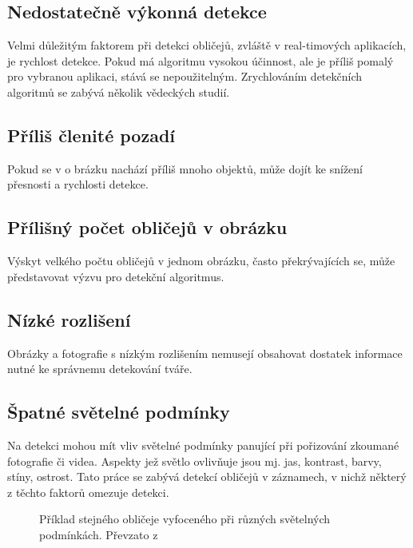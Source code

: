 \subsection*{Nedostatečně výkonná detekce}
Velmi důležitým faktorem při detekci obličejů, zvláště v real-timových aplikacích, je rychlost detekce. Pokud má algoritmu vysokou účinnost, ale je příliš pomalý pro vybranou aplikaci, stává se nepoužitelným. Zrychlováním detekčních algoritmů se zabývá několik vědeckých studií.

\subsection*{Příliš členité pozadí} 
Pokud se v o brázku nachází příliš mnoho objektů, může dojít ke snížení přesnosti a rychlosti detekce.

\subsection*{Přílišný počet obličejů v obrázku}
Výskyt velkého počtu obličejů v jednom obrázku, často překrývajících se, může představovat výzvu pro detekční algoritmus. 

\subsection*{Nízké rozlišení}
Obrázky a fotografie s nízkým rozlišením nemusejí obsahovat dostatek informace nutné ke správnemu detekování tváře.

\subsection*{Špatné světelné podmínky}
Na detekci mohou mít vliv světelné podmínky panující při pořizování zkoumané fotografie či videa. Aspekty jež světlo ovlivňuje jsou mj. jas, kontrast, barvy, stíny, ostrost. Tato práce se zabývá detekcí obličejů v záznamech, v nichž některý z těchto faktorů omezuje detekci.


\begin{figure}[H]
  \begin{center}
  \label{illuminationexample}
  \caption{Příklad stejného obličeje vyfoceného při různých světelných podmínkách. Převzato z \cite{feature-based-fd-review}}
  \end{center}
\end{figure}

